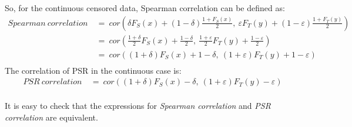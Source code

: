 \documentclass[]{article}
\let\epsilon\varepsilon
\begin{document}
So, for the continuous censored data, Spearman correlation can be defined as:
	$$
	\begin{aligned}
		Spearman~correlation~&=~ cor\left(  \delta F_S(x) + (1-\delta) \frac{1+F_S(x)}{2},~\epsilon F_T(y) + (1-\epsilon) \frac{1+F_T(y)}{2}  \right)\\
		&=~ cor\left(  \frac{1+\delta}{2}F_S(x) +  \frac{1-\delta}{2},~\frac{1+\epsilon}{2}F_T(y) +  \frac{1-\epsilon}{2}  \right)\\
		&=~ cor\left(  (1+\delta)F_S(x) +  1-\delta,~(1+\epsilon)F_T(y) +  1-\epsilon  \right)\\
	\end{aligned}
	$$
The correlation of PSR in the continuous case is:
	$$
	\begin{aligned}
		PSR~correlation~&=~ cor\left(  (1+\delta)F_S(x) -\delta,~(1+\epsilon)F_T(y) -\epsilon  \right)\\
	\end{aligned}
	$$

It is easy to check that the expressions for \emph{Spearman correlation} and \emph{PSR correlation} are equivalent.
	
\end{document}
